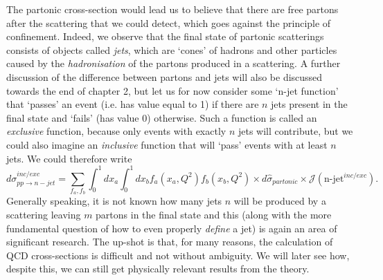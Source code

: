 The partonic cross-section would lead us to believe that there are free partons after the scattering that we could detect, which goes against the principle of confinement. Indeed, we observe that the final state of partonic scatterings consists of objects called \emph{jets}, which are `cones' of hadrons and other particles caused by the \emph{hadronisation} of the partons produced in a scattering. A further discussion of the difference between partons and jets will also be discussed towards the end of chapter 2, but let us for now consider some `n-jet function' that `passes' an event (i.e. has value equal to 1) if there are $n$ jets present in the final state and `fails' (has value 0) otherwise. Such a function is called an \emph{exclusive} function, because only events with exactly $n$ jets will contribute, but we could also imagine an \emph{inclusive} function that will `pass' events with at least $n$ jets. We could therefore write
\begin{equation}
d \sigma_{pp \to n-jet}^{inc/exc} = \sum_{f_a, f_b} \int_0^1 dx_a \int_0^1 dx_b f_a(x_a, Q^2) f_b(x_b, Q^2) \times d\hat{\sigma}_{partonic} \times \mathcal{J}(\text{n-jet}^{inc/exc}).
\end{equation}
Generally speaking, it is not known how many jets $n$ will be produced by a scattering leaving $m$ partons in the final state and this (along with the more fundamental question of how to even properly \emph{define} a jet) is again an area of significant research. The up-shot is that, for many reasons, the calculation of QCD cross-sections is difficult and not without ambiguity. We will later see how, despite this, we can still get physically relevant results from the theory. 

